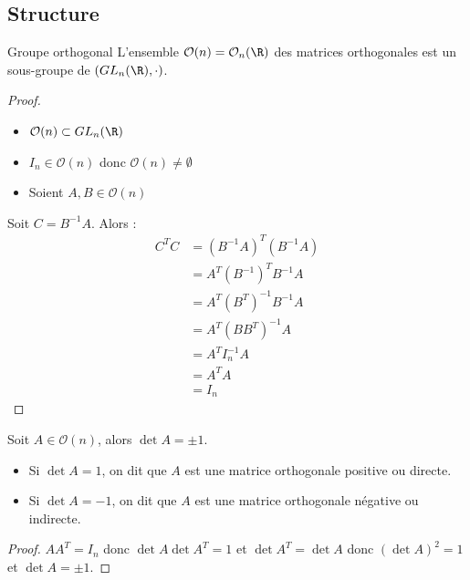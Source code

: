 \subsection{Structure}

\begin{theoreme}{Groupe orthogonal}{}
    L'ensemble $\mathcal O(n) = \mathcal O_n(\R)$ des matrices orthogonales est un sous-groupe de $(GL_n(\R), \cdot)$.
\end{theoreme}

\begin{proof}
    \begin{itemize}
        \item $\mathcal O(n) \subset GL_n(\R)$
        \item $I_n \in \mathcal O(n)$ donc $\mathcal O(n) \neq \emptyset$
        \item Soient $A, B \in \mathcal O(n)$
    \end{itemize}

    Soit $C = B^{-1} A$. Alors : 
    \begin{align}
        C^T C & = (B^{-1} A)^T (B^{-1} A) \\
        & = A^T (B^{-1})^T B^{-1} A \\
        & = A^T (B^T)^{-1} B^{-1} A \\
        & = A^T (B B^T)^{-1} A \\
        & = A^T I_n^{-1} A \\
        & = A^T A \\
        & = I_n
    \end{align}
\end{proof}


\lvspace 

\begin{proposition}{}{}
    Soit $A \in \mathcal O(n)$, alors $\det A = \pm 1$.

    \begin{itemize}
        \item Si $\det A= 1$, on dit que $A$ est une matrice orthogonale positive ou directe.
        \item Si $\det A = -1$, on dit que $A$ est une matrice orthogonale négative ou indirecte.
    \end{itemize}
\end{proposition}

\begin{proof}
    $A A^T = I_n$ donc $\det A \det A^T = 1$ et $\det A^T = \det A$ donc $(\det A)^2 = 1$ et $\det A = \pm 1$.
\end{proof}

